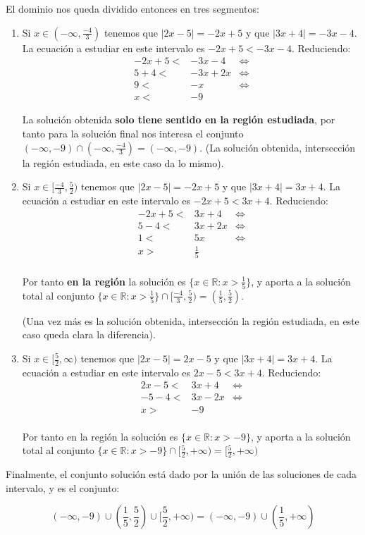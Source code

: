 \documentclass[10pt,a4paper]{article}
\begin{document}
El dominio nos queda dividido entonces en tres segmentos:
\begin{enumerate}
\item
  Si $x \in (-\infty, \frac{-4}{3})$ tenemos que $|2x-5| = -2x+5$ y que
  $|3x+4| = -3x-4$.
  La ecuación a estudiar en este intervalo es $ -2x+5 < -3x-4$.
  Reduciendo:
  \begin{align*}
    -2x+5 <& -3x-4    & \iff \\
    5 + 4 <& -3x + 2x & \iff \\
    9     <& -x       & \iff \\
    x     <& -9 &
  \end{align*}

  La solución obtenida {\bf solo tiene sentido en la región estudiada},
  por tanto para la solución final nos interesa el conjunto
  $(-\infty, -9) \cap (-\infty, \frac{-4}{3}) = (-\infty, -9)$.
  (La solución obtenida, intersección la región estudiada, en este caso da
  lo mismo).
  
\item
  Si $x \in [\frac{-4}{3}, \frac{5}{2})$ tenemos que $|2x-5| = -2x+5$ y que
  $|3x+4| = 3x+4$.
  La ecuación a estudiar en este intervalo es $ -2x+5 < 3x+4$.
  Reduciendo:
  \begin{align*}
    -2x+5  <& 3x+4     & \iff \\
     5 - 4 <& 3x + 2 x & \iff \\
     1     <& 5x       & \iff \\
     x     >& \frac{1}{5} &\\
  \end{align*}

  Por tanto {\bf en la región} la solución es
  $\{ x\in \mathbb{R} : x > \frac{1}{5}\}$, y aporta a la solución total
  al conjunto
  $\{ x\in \mathbb{R} : x > \frac{1}{5}\} \cap [\frac{-4}{3}, \frac{5}{2})
  = (\frac{1}{5}, \frac{5}{2})$.

  (Una vez más es la solución obtenida, intersección la región estudiada,
  en este caso queda clara la diferencia).
  

\item
  Si $x \in [\frac{5}{2},\infty)$ tenemos que $|2x-5| = 2x-5$ y que
  $|3x+4| = 3x+4$.
  La ecuación a estudiar en este intervalo es $ 2x-5 < 3x+4$.
  Reduciendo:
  \begin{align*}
    2x-5  <& 3x+4       & \iff \\
     -5 - 4 <& 3x - 2 x & \iff \\
     x >& -9 \\
  \end{align*}

  \noindent
  Por tanto en la región la solución es
  $\{ x\in \mathbb{R} : x > -9 \}$, y aporta a la solución total al conjunto
  $\{ x\in \mathbb{R} : x > -9 \} \cap [\frac{5}{2},+\infty)
    = [\frac{5}{2},+\infty)$
  
\end{enumerate}

Finalmente, el conjunto solución está dado por la unión de las soluciones
de cada intervalo, y es el conjunto:

$$(-\infty, -9) \cup (\frac{1}{5}, \frac{5}{2}) \cup [\frac{5}{2},+\infty)
  = (-\infty, -9) \cup (\frac{1}{5}, +\infty)$$
\end{document}
